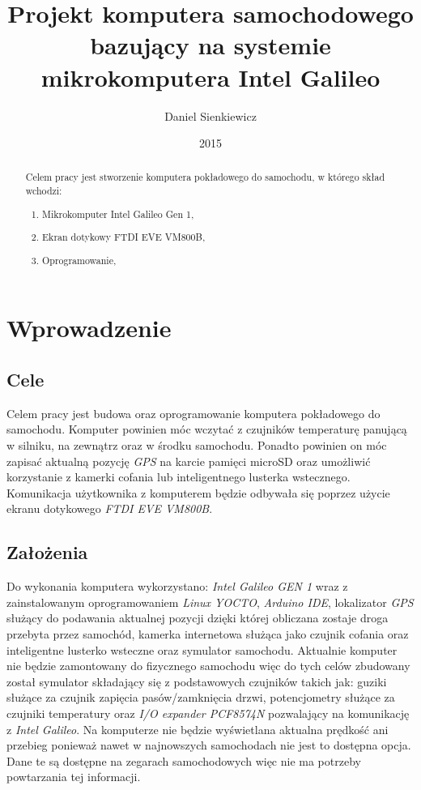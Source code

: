 \documentclass{xmgr}
\author   {Daniel Sienkiewicz}
\title    {Projekt komputera samochodowego bazujący na systemie mikrokomputera Intel Galileo}
\date     {2015}
\begin{document}
\begin{abstract}
Celem pracy jest stworzenie komputera pokładowego do samochodu, w którego skład wchodzi: \begin{enumerate}
\item Mikrokomputer Intel Galileo Gen 1, 
\item Ekran dotykowy FTDI EVE VM800B, 
\item Oprogramowanie,
\end{enumerate}

\end{abstract}
\maketitle

\chapter{Wprowadzenie}
\section{Cele}
Celem pracy jest budowa oraz oprogramowanie komputera pokładowego do samochodu. Komputer powinien móc wczytać z czujników temperaturę panującą w silniku, na zewnątrz oraz w środku samochodu. Ponadto powinien on móc zapisać aktualną pozycję \emph{GPS} na karcie pamięci microSD oraz umożliwić korzystanie z kamerki cofania lub inteligentnego lusterka wstecznego. Komunikacja użytkownika z komputerem będzie odbywała się poprzez użycie ekranu dotykowego \emph{FTDI EVE VM800B}.
\section{Założenia}
Do wykonania komputera wykorzystano: \emph{Intel Galileo GEN 1} wraz z zainstalowanym oprogramowaniem \emph{Linux YOCTO}, \emph{Arduino IDE}, lokalizator \emph{GPS} służący do podawania aktualnej pozycji dzięki której obliczana zostaje droga przebyta przez samochód, kamerka internetowa służąca jako czujnik cofania oraz inteligentne lusterko wsteczne oraz symulator samochodu. Aktualnie komputer nie będzie zamontowany do fizycznego samochodu więc do tych celów zbudowany został symulator składający się z podstawowych czujników takich jak: guziki służące za czujnik zapięcia pasów/zamknięcia drzwi, potencjometry służące za czujniki temperatury oraz \emph{I/O expander PCF8574N} pozwalający na komunikację z \emph{Intel Galileo}. Na komputerze nie będzie wyświetlana aktualna prędkość ani przebieg ponieważ nawet w najnowszych samochodach nie jest to dostępna opcja. Dane te są dostępne na zegarach samochodowych więc nie ma potrzeby powtarzania tej informacji.
\end{document}
